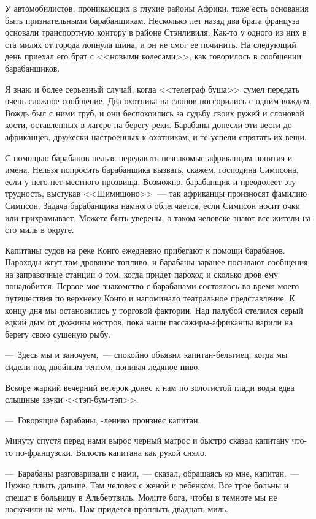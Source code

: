 \documentclass[12pt,a4paper,twoside,openany,svgnames]{memoir}
\begin{document}
У автомобилистов, проникающих в глухие районы Африки, тоже есть основания быть признательными барабанщикам. Несколько лет назад два брата француза основали транспортную контору в районе Стэнливиля. Как-то у одного из них в ста милях от города лопнула шина, и он не смог ее починить. На следующий день приехал его брат с <<новыми колесами>>, как говорилось в сообщении барабанщиков.

Я знаю и более серьезный случай, когда <<телеграф буша>> сумел передать очень сложное сообщение. Два охотника на слонов поссорились с одним вождем. Вождь был с ними груб, и они беспокоились за судьбу своих ружей и слоновой кости, оставленных в лагере на берегу реки. Барабаны донесли эти вести до африканцев, дружески настроенных к охотникам, и те успели спрятать их вещи.

С помощью барабанов нельзя передавать незнакомые африканцам понятия и имена. Нельзя попросить барабанщика вызвать, скажем, господина Симпсона, если у него нет местного прозвища. Возможно, барабанщик и преодолеет эту трудность, выстукав <<Шимишоно>>~--- так африканцы произносят фамилию Симпсон. Задача барабанщика намного облегчается, если Симпсон носит очки или прихрамывает. Можете быть уверены, о таком человеке знают все жители на сто миль в округе.

Капитаны судов на реке Конго ежедневно прибегают к помощи барабанов. Пароходы жгут там дровяное топливо, и барабаны заранее посылают сообщения на заправочные станции о том, когда придет пароход и сколько дров ему понадобится. Первое мое знакомство с барабанами состоялось во время моего путешествия по верхнему Конго и напоминало театральное представление. К концу дня мы остановились у торговой фактории. Над палубой стелился серый едкий дым от дюжины костров, пока наши пассажиры-африканцы варили на берегу свою сушеную рыбу.

---~Здесь мы и заночуем,~--- спокойно объявил капитан-бельгиец, когда мы сидели под двойным тентом, попивая ледяное пиво.

Вскоре жаркий вечерний ветерок донес к нам по золотистой глади воды едва слышные звуки <<тэп-бум-тэп>>.

---~Говорящие барабаны, -лениво произнес капитан.

Минуту спустя перед нами вырос черный матрос и быстро сказал капитану что-то по-французски. Вялость капитана как рукой сняло.

---~Барабаны разговаривали с нами,~--- сказал, обращаясь ко мне, капитан.~--- Нужно плыть дальше. Там человек с женой и ребенком. Все трое больны и спешат в больницу в Альбертвиль. Молите бога, чтобы в темноте мы не наскочили на мель. Нам придется проплыть двадцать миль.
\end{document}
